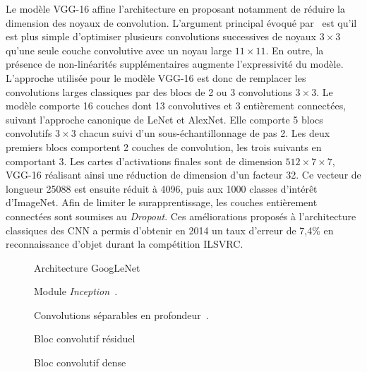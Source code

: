 Le modèle VGG-16 affine l'architecture en proposant notamment de réduire la dimension des noyaux de convolution. L'argument principal évoqué par~\cite{chatfield_return_2014,simonyan_very_2014} est qu'il est plus simple d'optimiser plusieurs convolutions successives de noyaux $3\times3$ qu'une seule couche convolutive avec un noyau large $11\times11$. En outre, la présence de non-linéarités supplémentaires augmente l'expressivité du modèle. L'approche utilisée pour le modèle VGG-16 est donc de remplacer les convolutions larges classiques par des blocs de 2 ou 3 convolutions $3\times3$. Le modèle comporte 16 couches dont 13 convolutives et 3 entièrement connectées, suivant l'approche canonique de LeNet et AlexNet. Elle comporte 5 blocs convolutifs $3\times3$ chacun suivi d'un sous-échantillonnage de pas 2. Les deux premiers blocs comportent 2 couches de convolution, les trois suivants en comportant 3. Les cartes d'activations finales sont de dimension $512\times7\times7$, VGG-16 réalisant ainsi une réduction de dimension d'un facteur 32. Ce vecteur de longueur 25088 est ensuite réduit à 4096, puis aux 1000 classes d'intérêt d'ImageNet. Afin de limiter le surapprentissage, les couches entièrement connectées sont soumises au \emph{Dropout}. Ces améliorations proposés à l'architecture classiques des \gls{CNN} a permis d'obtenir en 2014 un taux d'erreur de 7,4\% en reconnaissance d'objet durant la compétition \gls{ILSVRC}.

\begin{figure}[t]
  \resizebox{\textwidth}{!}{
    
  }
  \caption{Architecture GoogLeNet~\cite{szegedy_going_2015}}
  \label{fig:googlenet}
\end{figure}

\begin{figure}
  \begin{minipage}{0.48\textwidth}
    \resizebox{\textwidth}{!}{
      
    }
    \caption{Module \emph{Inception}~\cite{szegedy_going_2015}.}
    \label{fig:inception}
  \end{minipage}
  \hfill
  \begin{minipage}{0.48\textwidth}
    \resizebox{\textwidth}{!}{
      
    }
    \caption{Convolutions séparables en profondeur~\cite{chollet_xception_2017}.}
    \label{fig:depthwise}
  \end{minipage}
\end{figure}

\begin{figure}[t]
  \begin{minipage}{0.5\textwidth}
    \resizebox{\textwidth}{!}{
      
    }
    \caption{Bloc convolutif résiduel~\cite{he_deep_2016}}
    \label{fig:residual}
  \end{minipage}
  \begin{minipage}{0.5\textwidth}
  \resizebox{\textwidth}{!}{
    
  }
  \caption{Bloc convolutif dense~\cite{huang_densely_2017}}
  \label{fig:denseblock}
  \end{minipage}
\end{figure}

